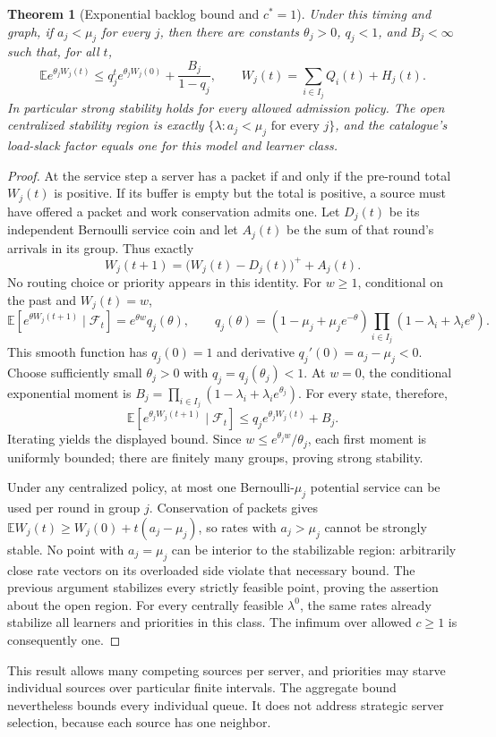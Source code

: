 \documentclass[11pt]{article}
\newtheorem{theorem}{Theorem}
\theoremstyle{definition}
\newcommand{\E}{\mathbb E}
\begin{document}
\begin{theorem}[Exponential backlog bound and $c^*=1$]\label{stars}
Under this timing and graph, if $a_j<\mu_j$ for every $j$, then there are
constants $\theta_j>0$, $q_j<1$, and $B_j<\infty$ such that, for all $t$,
\[
 \E e^{\theta_j W_j(t)}\le
 q_j^t e^{\theta_j W_j(0)}+\frac{B_j}{1-q_j},
 \qquad W_j(t)=\sum_{i\in I_j}Q_i(t)+H_j(t).
\]
In particular strong stability holds for every allowed admission policy.
The open centralized stability region is exactly
$\{\lambda:a_j<\mu_j\text{ for every }j\}$, and the catalogue's load-slack
factor equals one for this model and learner class.
\end{theorem}
\begin{proof}
At the service step a server has a packet if and only if the pre-round
total $W_j(t)$ is positive. If its buffer is empty but the total is positive,
a source must have offered a packet and work conservation admits one.
Let $D_j(t)$ be its independent Bernoulli service coin and let
$A_j(t)$ be the sum of that round's arrivals in its group. Thus exactly
\[
 W_j(t+1)=\bigl(W_j(t)-D_j(t)\bigr)^++A_j(t).
\]
No routing choice or priority appears in this identity. For $w\ge1$,
conditional on the past and $W_j(t)=w$,
\[
 \E[e^{\theta W_j(t+1)}\mid\mathcal F_t]
 =e^{\theta w}q_j(\theta),\qquad
 q_j(\theta)=(1-\mu_j+\mu_j e^{-\theta})
 \prod_{i\in I_j}(1-\lambda_i+\lambda_i e^\theta).
\]
This smooth function has $q_j(0)=1$ and derivative
$q_j'(0)=a_j-\mu_j<0$. Choose sufficiently small $\theta_j>0$ with
$q_j=q_j(\theta_j)<1$. At $w=0$, the conditional exponential moment is
$B_j=\prod_{i\in I_j}(1-\lambda_i+\lambda_i e^{\theta_j})$.
For every state, therefore,
\[
 \E[e^{\theta_j W_j(t+1)}\mid\mathcal F_t]
 \le q_j e^{\theta_j W_j(t)}+B_j.
\]
Iterating yields the displayed bound. Since
$w\le e^{\theta_j w}/\theta_j$, each first moment is uniformly bounded;
there are finitely many groups, proving strong stability.

Under any centralized policy, at most one Bernoulli-$\mu_j$ potential
service can be used per round in group $j$. Conservation of packets gives
$\E W_j(t)\ge W_j(0)+t(a_j-\mu_j)$, so rates with $a_j>\mu_j$ cannot
be strongly stable. No point with $a_j=\mu_j$ can be interior to the
stabilizable region: arbitrarily close rate vectors on its overloaded
side violate that necessary bound. The previous argument stabilizes every
strictly feasible point, proving the assertion about the open region.
For every centrally feasible $\lambda^0$, the same rates already stabilize
all learners and priorities in this class. The infimum over allowed
$c\ge1$ is consequently one.
\end{proof}
This result allows many competing sources per server, and priorities may
starve individual sources over particular finite intervals. The aggregate
bound nevertheless bounds every individual queue. It does not address
strategic server selection, because each source has one neighbor.
\end{document}
